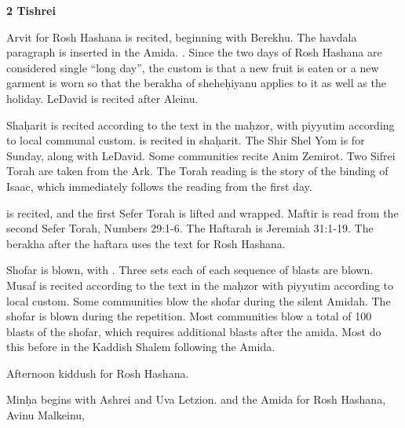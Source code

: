 {\textbf{2 Tishrei}

Arvit for Rosh Hashana is recited, beginning with Berekhu.  The havdala paragraph is inserted in the Amida.  \yakenhaz . Since the two days of Rosh Hashana are considered single ``long day'', the custom is that a new fruit is eaten or a new garment is worn so that the berakha of shehe\d{h}iyanu applies to it as well as the holiday. LeDavid is recited after Aleinu.

Sha\d{h}arit is recited according to the text in the ma\d{h}zor, with piyyutim according to local communal custom.  is recited in sha\d{h}arit. The Shir Shel Yom is for Sunday, along with LeDavid.  Some communities recite Anim Zemirot.  Two Sifrei Torah are taken from the Ark.  The Torah reading is the story of the binding of Isaac, which immediately follows the reading from the first day.

\roshhashanatwoleining

\halfkad is recited, and the first Sefer Torah is lifted and wrapped. Maftir is read from the second Sefer Torah, Numbers 29:1-6.  The Haftarah is Jeremiah 31:1-19. The berakha after the haftara uses the text for Rosh Hashana.

Shofar is blown, with . Three sets each of each sequence of blasts are blown.  Musaf is recited according to the text in the ma\d{h}zor with piyyutim according to local custom. Some communities blow the shofar during the silent Amidah.  The shofar is blown during the repetition.  Most communities blow a total of 100 blasts of the shofar, which requires additional blasts after the amida.  Most do this before  in the Kaddish Shalem following the Amida.

Afternoon kiddush for Rosh Hashana.

Min\d{h}a begins with Ashrei and Uva Letzion. \halfkad and the Amida for Rosh Hashana, Avinu Malkeinu, \fullkad

}

\newcommand{\tishreiShab}{
\roshhashanashabbat
}